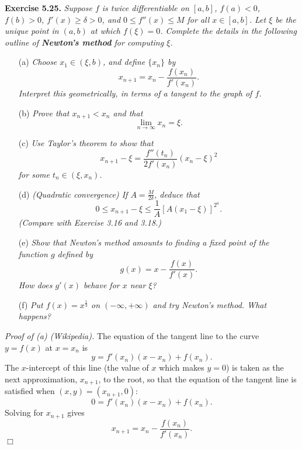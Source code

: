 \documentclass{article}
\begin{document}



\textbf{Exercise 5.25.}
\emph{Suppose $f$ is twice differentiable on $[a,b]$,
$f(a) < 0$, $f(b) > 0$, $f'(x) \geq \delta > 0$,
and $0 \leq f''(x) \leq M$ for all $x \in [a,b]$.
Let $\xi$ be the unique point in $(a,b)$ at which $f(\xi) = 0$.
Complete the details in the following outline of
\textbf{Newton's method} for computing $\xi$.}
\begin{enumerate}
\item[(a)]
\emph{Choose $x_1 \in (\xi,b)$, and define $\{ x_n \}$ by
\[
  x_{n+1} = x_n - \frac{f(x_n)}{f'(x_n)}.
\]
Interpret this geometrically, in terms of a tangent to the graph of $f$.}

\item[(b)]
\emph{Prove that $x_{n+1} < x_n$ and that
\[
  \lim_{n \to \infty}{x_n} = \xi.
\]}
\item[(c)]
\emph{Use Taylor's theorem to show that
\[
  x_{n+1} - \xi = \frac{f''(t_n)}{2 f'(x_n)} (x_n-\xi)^2
\]
for some $t_n \in (\xi,x_n)$.}

\item[(d)]
\emph{(Quadratic convergence)
If $A = \frac{M}{2\delta}$, deduce that
\[
  0 \leq x_{n+1} - \xi \leq \frac{1}{A} [A(x_1 - \xi)]^{2^n}.
\]
(Compare with Exercise 3.16 and 3.18.)}

\item[(e)]
\emph{Show that Newton's method amounts to finding a fixed point of the function $g$ defined by
\[
  g(x) = x - \frac{f(x)}{f'(x)}.
\]
How does $g'(x)$ behave for $x$ near $\xi$?}

\item[(f)]
\emph{Put $f(x) = x^{\frac{1}{3}}$ on $(-\infty, +\infty)$ and try Newton's method.
What happens?} \\
\end{enumerate}



\emph{Proof of (a) (Wikipedia).}
The equation of the tangent line to the curve $y = f(x)$ at $x = x_n$ is
\[
  y = f'(x_n)(x - x_n) + f(x_n).
\]
The $x$-intercept of this line (the value of $x$ which makes $y = 0$)
is taken as the next approximation, $x_{n+1}$, to the root,
so that the equation of the tangent line is satisfied when
$(x,y) = (x_{n+1},0)$:
\[
  0 = f'(x_n)(x - x_n) + f(x_n).
\]
Solving for $x_{n+1}$ gives
\[
  x_{n+1} = x_n - \frac{f(x_n)}{f'(x_n)}.
\]
$\Box$ \\
\end{document}
